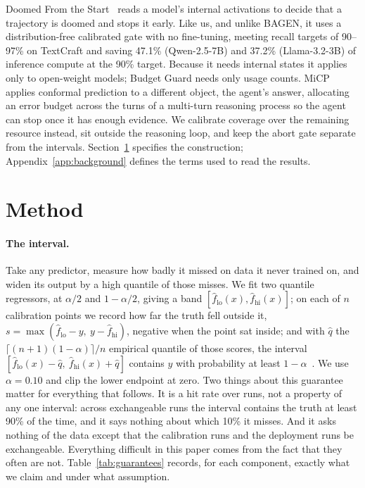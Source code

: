 Doomed From the Start~\cite{ruan2026doomed} reads a model's internal activations to decide that a trajectory is doomed and stops it early. Like us, and unlike BAGEN, it uses a distribution-free calibrated gate with no fine-tuning, meeting recall targets of 90--97\% on TextCraft and saving 47.1\% (Qwen-2.5-7B) and 37.2\% (Llama-3.2-3B) of inference compute at the 90\% target. Because it needs internal states it applies only to open-weight models; Budget Guard needs only usage counts. MiCP~\cite{zhou2026adaptive} applies conformal prediction to a different object, the agent's answer, allocating an error budget across the turns of a multi-turn reasoning process so the agent can stop once it has enough evidence. We calibrate coverage over the remaining resource instead, sit outside the reasoning loop, and keep the abort gate separate from the intervals. Section~\ref{sec:method} specifies the construction; Appendix~\ref{app:background} defines the terms used to read the results.

\FloatBarrier
\section{Method}
\label{sec:method}

\paragraph{The interval.}
Take any predictor, measure how badly it missed on data it never trained on, and widen its output by a high quantile of those misses. We fit two quantile regressors, at $\alpha/2$ and $1{-}\alpha/2$, giving a band $[\hat f_{\mathrm{lo}}(x), \hat f_{\mathrm{hi}}(x)]$; on each of $n$ calibration points we record how far the truth fell outside it, $s=\max(\hat f_{\mathrm{lo}}-y,\ y-\hat f_{\mathrm{hi}})$, negative when the point sat inside; and with $\hat q$ the $\lceil (n+1)(1{-}\alpha)\rceil/n$ empirical quantile of those scores, the interval $[\hat f_{\mathrm{lo}}(x)-\hat q,\ \hat f_{\mathrm{hi}}(x)+\hat q]$ contains $y$ with probability at least $1{-}\alpha$~\cite{romano2019cqr}. We use $\alpha{=}0.10$ and clip the lower endpoint at zero. Two things about this guarantee matter for everything that follows. It is a hit rate over runs, not a property of any one interval: across exchangeable runs the interval contains the truth at least 90\% of the time, and it says nothing about which 10\% it misses. And it asks nothing of the data except that the calibration runs and the deployment runs be exchangeable. Everything difficult in this paper comes from the fact that they often are not. Table~\ref{tab:guarantees} records, for each component, exactly what we claim and under what assumption.

